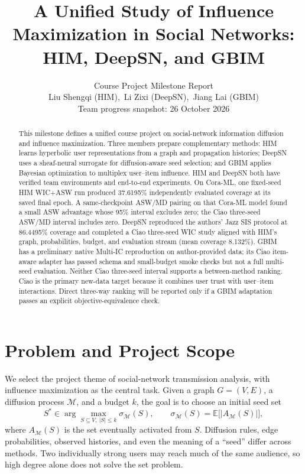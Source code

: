 \documentclass[10pt,twocolumn]{article}
\title{A Unified Study of Influence Maximization in Social Networks:\\
HIM, DeepSN, and GBIM}
\author{Course Project Milestone Report\\
Liu Shengqi (HIM),\ Li Zixi (DeepSN),\ Jiang Lai (GBIM)\\
Team progress snapshot: 26 October 2026}
\date{}
\begin{document}
\maketitle

\begin{abstract}
This milestone defines a unified course project on social-network information diffusion and influence maximization. Three members prepare complementary methods: HIM learns hyperbolic user representations from a graph and propagation histories; DeepSN uses a sheaf-neural surrogate for diffusion-aware seed selection; and GBIM applies Bayesian optimization to multiplex user--item influence. HIM and DeepSN both have verified team environments and end-to-end experiments. On Cora-ML, one fixed-seed HIM WIC+ASW run produced 37.6195\% independently evaluated coverage at its saved final epoch. A same-checkpoint ASW/MD pairing on that Cora-ML model found a small ASW advantage whose 95\% interval excludes zero; the Ciao three-seed ASW/MD interval includes zero. DeepSN reproduced the authors' Jazz SIS protocol at 86.4495\% coverage and completed a Ciao three-seed WIC study aligned with HIM's graph, probabilities, budget, and evaluation stream (mean coverage 8.132\%). GBIM has a preliminary native Multi-IC reproduction on author-provided data; its Ciao item-aware adapter has passed schema and small-budget smoke checks but not a full multi-seed evaluation. Neither Ciao three-seed interval supports a between-method ranking. Ciao is the primary new-data target because it combines user trust with user--item interactions. Direct three-way ranking will be reported only if a GBIM adaptation passes an explicit objective-equivalence check.
\end{abstract}

\section{Problem and Project Scope}
We select the project theme of social-network transmission analysis, with influence maximization as the central task. Given a graph $G=(V,E)$, a diffusion process $\mathcal{M}$, and a budget $k$, the goal is to choose an initial seed set
\begin{equation}
S^* \in \arg\max_{S\subseteq V,\ |S|\leq k}
\sigma_{\mathcal{M}}(S), \qquad
\sigma_{\mathcal{M}}(S)=\mathbb{E}\bigl[|A_{\mathcal{M}}(S)|\bigr],
\end{equation}
where $A_{\mathcal{M}}(S)$ is the set eventually activated from $S$. Diffusion rules, edge probabilities, observed histories, and even the meaning of a ``seed'' differ across methods. Two individually strong users may reach much of the same audience, so high degree alone does not solve the set problem.
\end{document}
